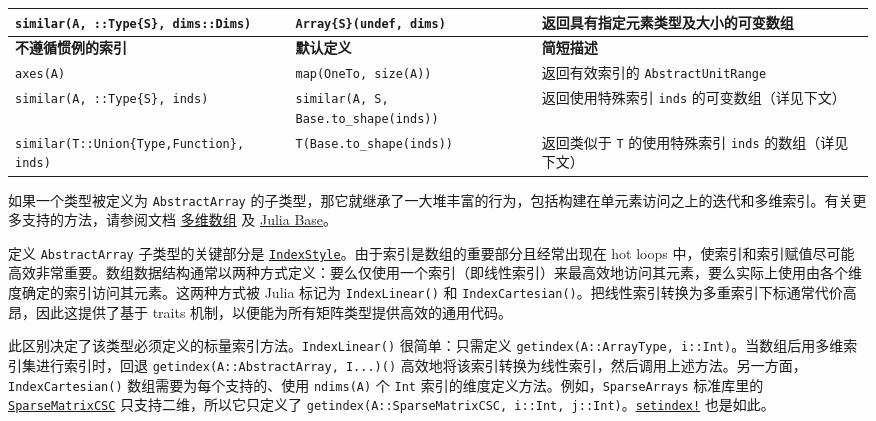 \begin{table}[h]
\begin{tabulary}{\linewidth}{|L|L|L|}
\hline
\texttt{similar(A, ::Type\{S\}, dims::Dims)} & \texttt{Array\{S\}(undef, dims)} & 返回具有指定元素类型及大小的可变数组 \\
\hline
\textbf{不遵循惯例的索引} & \textbf{默认定义} & \textbf{简短描述} \\
\hline
\texttt{axes(A)} & \texttt{map(OneTo, size(A))} & 返回有效索引的 \texttt{AbstractUnitRange} \\
\hline
\texttt{similar(A, ::Type\{S\}, inds)} & \texttt{similar(A, S, Base.to\_shape(inds))} & 返回使用特殊索引 \texttt{inds} 的可变数组（详见下文） \\
\hline
\texttt{similar(T::Union\{Type,Function\}, inds)} & \texttt{T(Base.to\_shape(inds))} & 返回类似于 \texttt{T} 的使用特殊索引 \texttt{inds} 的数组（详见下文） \\
\hline
\end{tabulary}

\end{table}



如果一个类型被定义为 \texttt{AbstractArray} 的子类型，那它就继承了一大堆丰富的行为，包括构建在单元素访问之上的迭代和多维索引。有关更多支持的方法，请参阅文档 \hyperlink{16720099245556932994}{多维数组} 及 \hyperlink{3951748617092839742}{Julia Base}。



定义 \texttt{AbstractArray} 子类型的关键部分是 \hyperlink{7782790551324367092}{\texttt{IndexStyle}}。由于索引是数组的重要部分且经常出现在 hot loops 中，使索引和索引赋值尽可能高效非常重要。数组数据结构通常以两种方式定义：要么仅使用一个索引（即线性索引）来最高效地访问其元素，要么实际上使用由各个维度确定的索引访问其元素。这两种方式被 Julia 标记为 \texttt{IndexLinear()} 和 \texttt{IndexCartesian()}。把线性索引转换为多重索引下标通常代价高昂，因此这提供了基于 traits 机制，以便能为所有矩阵类型提供高效的通用代码。



此区别决定了该类型必须定义的标量索引方法。\texttt{IndexLinear()} 很简单：只需定义 \texttt{getindex(A::ArrayType, i::Int)}。当数组后用多维索引集进行索引时，回退 \texttt{getindex(A::AbstractArray, I...)()} 高效地将该索引转换为线性索引，然后调用上述方法。另一方面，\texttt{IndexCartesian()} 数组需要为每个支持的、使用 \texttt{ndims(A)} 个 \texttt{Int} 索引的维度定义方法。例如，\texttt{SparseArrays} 标准库里的 \hyperlink{15099699527958384292}{\texttt{SparseMatrixCSC}} 只支持二维，所以它只定义了 \texttt{getindex(A::SparseMatrixCSC, i::Int, j::Int)}。\hyperlink{1309244355901386657}{\texttt{setindex!}} 也是如此。



